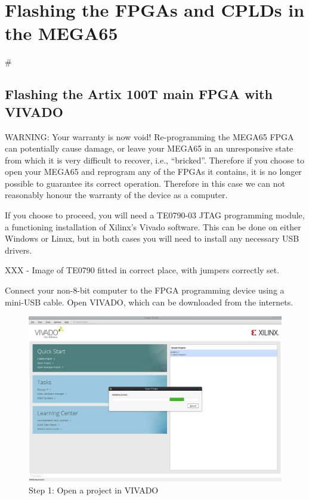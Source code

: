 \chapter{Flashing the FPGAs and CPLDs in the MEGA65}
#
\section{Flashing the Artix 100T main FPGA with VIVADO}

WARNING: Your warranty is now void! Re-programming the MEGA65 FPGA can potentially cause
damage, or leave your MEGA65 in an unresponsive state from which it is very difficult to
recover, i.e., ``bricked''.  Therefore if you choose to open your MEGA65 and reprogram
any of the FPGAs it contains, it is no longer possible to guarantee its correct operation.
Therefore in this case we can not reasonably honour the warranty of the device as a computer.

If you choose to proceed, you will need a TE0790-03 JTAG programming module, a functioning
installation of Xilinx's Vivado software.  This can be done on either Windows or Linux, but
in both cases you will need to install any necessary USB drivers.

XXX - Image of TE0790 fitted in correct place, with jumpers correctly set.

Connect your non-8-bit computer to the FPGA programming device using a mini-USB cable. Open VIVADO, which can be downloaded from the internets.

\begin{figure}
  \includegraphics[width=\linewidth]{images/vivado01.png}
  \caption{Step 1: Open a project in VIVADO}
  \label{fig:vivado01}
\end{figure}

